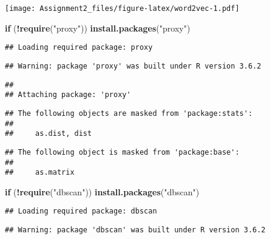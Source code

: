 \documentclass[]{article}
\newenvironment{Shaded}{\begin{snugshade}}{\end{snugshade}}
\newcommand{\ControlFlowTok}[1]{\textcolor[rgb]{0.13,0.29,0.53}{\textbf{#1}}}
\newcommand{\DataTypeTok}[1]{\textcolor[rgb]{0.13,0.29,0.53}{#1}}
\newcommand{\DecValTok}[1]{\textcolor[rgb]{0.00,0.00,0.81}{#1}}
\newcommand{\FloatTok}[1]{\textcolor[rgb]{0.00,0.00,0.81}{#1}}
\newcommand{\KeywordTok}[1]{\textcolor[rgb]{0.13,0.29,0.53}{\textbf{#1}}}
\newcommand{\NormalTok}[1]{#1}
\newcommand{\OperatorTok}[1]{\textcolor[rgb]{0.81,0.36,0.00}{\textbf{#1}}}
\newcommand{\StringTok}[1]{\textcolor[rgb]{0.31,0.60,0.02}{#1}}
\begin{document}
\texttt{[image: Assignment2\_files/figure-latex/word2vec-1.pdf]}

\begin{Shaded}
\begin{Highlighting}[]
\ControlFlowTok{if}\NormalTok{ (}\OperatorTok{!}\KeywordTok{require}\NormalTok{(}\StringTok{"proxy"}\NormalTok{)) }\KeywordTok{install.packages}\NormalTok{(}\StringTok{"proxy"}\NormalTok{)}
\end{Highlighting}
\end{Shaded}

\begin{verbatim}
## Loading required package: proxy
\end{verbatim}

\begin{verbatim}
## Warning: package 'proxy' was built under R version 3.6.2
\end{verbatim}

\begin{verbatim}
## 
## Attaching package: 'proxy'
\end{verbatim}

\begin{verbatim}
## The following objects are masked from 'package:stats':
## 
##     as.dist, dist
\end{verbatim}

\begin{verbatim}
## The following object is masked from 'package:base':
## 
##     as.matrix
\end{verbatim}

\begin{Shaded}
\begin{Highlighting}[]
\ControlFlowTok{if}\NormalTok{ (}\OperatorTok{!}\KeywordTok{require}\NormalTok{(}\StringTok{"dbscan"}\NormalTok{)) }\KeywordTok{install.packages}\NormalTok{(}\StringTok{"dbscan"}\NormalTok{)}
\end{Highlighting}
\end{Shaded}

\begin{verbatim}
## Loading required package: dbscan
\end{verbatim}

\begin{verbatim}
## Warning: package 'dbscan' was built under R version 3.6.2
\end{verbatim}

\begin{Shaded}
\end{Shaded}
\end{document}
